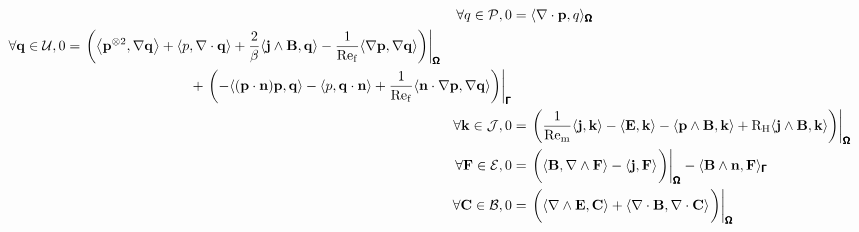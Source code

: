     \begin{align}
        \forall q \in \calP,  0  &=  \langle\nabla\cdot\bfp, q\rangle_{\bfOmega}  \\
        \begin{split}
            \forall \bfq \in \calU,  0  &=  \left.\left(\left\langle\bfp^{\otimes 2}, \nabla\bfq\right\rangle + \langle p, \nabla\cdot\bfq\rangle + \frac{2}{\beta}\langle\bfj\wedge\bfB, \bfq\rangle - \frac{1}{\rmRef}\langle\nabla\bfp, \nabla\bfq\rangle\right)\right|_{\bfOmega}  \\
            &\;\;\;\;\;\;\;\;\;\;\;\;\;\;\;\;\;\;\;\;\;\;\;\;\;\;\;\;\;\;\;\;  + \left.\left(- \langle(\bfp\cdot\bfn)\bfp, \bfq\rangle - \langle p, \bfq\cdot\bfn\rangle + \frac{1}{\rmRef}\langle\bfn\cdot\nabla\bfp, \nabla\bfq\rangle\right)\right|_{\bfGamma}
        \end{split}  \\
        \forall \bfk \in \calJ,  0  &=  \left.\left(\frac{1}{\rmRem}\langle\bfj, \bfk\rangle - \langle\bfE, \bfk\rangle - \langle\bfp\wedge\bfB, \bfk\rangle + \rmRH\langle\bfj\wedge\bfB, \bfk\rangle\right)\right|_{\bfOmega}  \\
        \forall \bfF \in \calE,  0  &=  \left.\left(\langle\bfB, \nabla\wedge\bfF\rangle - \langle\bfj, \bfF\rangle\tall\right)\right|_{\bfOmega} - \langle\bfB\wedge\bfn, \bfF\rangle_{\bfGamma}  \\
        \forall \bfC \in \calB,  0  &=  \left.\left(\langle\nabla\wedge\bfE, \bfC\rangle + \langle\nabla\cdot\bfB, \nabla\cdot\bfC\rangle\tall\right)\right|_{\bfOmega}
    \end{align}

